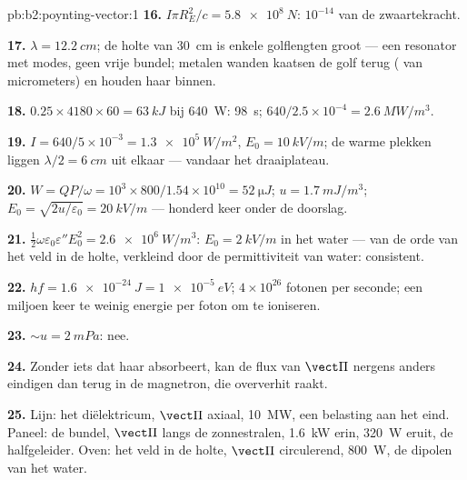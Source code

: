 \begin{solution}{pb:b2:poynting-vector:1}
\textbf{16.} $I\pi R_E^2/c = \qty{5.8e8}{N}$: $10^{-14}$ van de zwaartekracht.

\textbf{17.} $\lambda = \qty{12.2}{cm}$; de holte van \qty{30}{cm} is enkele
golflengten groot --- een resonator met modes, geen vrije bundel; metalen
wanden kaatsen de golf terug ( van micrometers) en houden haar
binnen.

\textbf{18.} $0.25 \times 4180 \times 60 = \qty{63}{kJ}$ bij \qty{640}{W}:
\qty{98}{s}; $640/2.5 \times 10^{-4} = \qty{2.6}{MW/m^3}$.

\textbf{19.} $I = 640/5 \times 10^{-3} = \qty{1.3e5}{W/m^2}$,
$E_0 = \qty{10}{kV/m}$; de warme plekken liggen $\lambda/2 = \qty{6}{cm}$
uit elkaar --- vandaar het draaiplateau.

\textbf{20.}
$W = QP/\omega = 10^3 \times 800/1.54 \times 10^{10} = \qty{52}{\micro J}$;
$u =
\qty{1.7}{mJ/m^3}$; $E_0 = \sqrt{2u/\varepsilon_0} = \qty{20}{kV/m}$
--- honderd keer onder de doorslag.

\textbf{21.}
$\tfrac12\omega\varepsilon_0\varepsilon''E_0^2 = \qty{2.6e6}{W/m^3}$:
$E_0 = \qty{2}{kV/m}$ in het water --- van de orde van het veld in de holte,
verkleind door de permittiviteit van water: consistent.

\textbf{22.} $hf = \qty{1.6e-24}{J} = \qty{1e-5}{eV}$; $4 \times 10^{26}$
fotonen per seconde; een miljoen keer te weinig energie per foton om te
ioniseren.

\textbf{23.} $\sim u = \qty{2}{mPa}$: nee.

\textbf{24.} Zonder iets dat haar absorbeert, kan de flux van $\vect\Pi$
nergens anders eindigen dan terug in de magnetron, die oververhit raakt.

\textbf{25.} Lijn: het diëlektricum, $\vect\Pi$ axiaal, \qty{10}{MW}, een
belasting aan het eind. Paneel: de bundel, $\vect\Pi$ langs de zonnestralen,
\qty{1.6}{kW} erin, \qty{320}{W} eruit, de halfgeleider. Oven: het veld in
de holte, $\vect\Pi$ circulerend, \qty{800}{W}, de dipolen van het water.
\end{solution}
